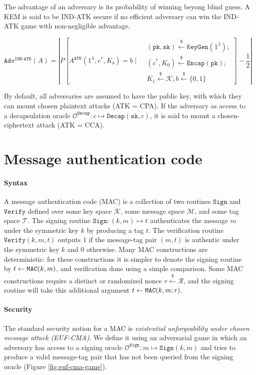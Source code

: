 \documentclass[letterpaper,12pt,titlepage,oneside,final]{book}
\newcommand{\keygen}{\texttt{KeyGen}}
\newcommand{\encap}{\texttt{Encap}}
\newcommand{\decap}{\texttt{Decap}}
\newcommand{\mac}{\texttt{\texttt{MAC}}}
\newcommand{\sign}{\texttt{Sign}}
\newcommand{\verify}{\texttt{Verify}}
\newcommand{\pk}{\texttt{pk}}
\newcommand{\sk}{\texttt{sk}}
\newcommand{\leftsample}{\stackrel{\$}{\leftarrow}}
\begin{document}
The advantage of an adversary is its probability of winning beyong blind guess. A KEM is said to be IND-ATK secure if no efficient adversary can win the IND-ATK game with non-negligible advantage.

$$
\texttt{Adv}^\texttt{IND-ATK}(A) = \left\vert P\left[
    A^\texttt{ATK}(1^\lambda, c^\ast, K_b) = b
    \mid \begin{aligned}
    &(\pk, \sk) \leftsample \keygen(1^\lambda); \\
    &(c^\ast, K_0) \leftsample \encap(\pk); \\
    &K_1 \leftsample \mathcal{K}; b \leftsample \{0,1\}
    \end{aligned}
\right] - \frac{1}{2}
\right\vert
$$

By default, all adversaries are assumed to have the public key, with which they can mount chosen plaintext attacks (ATK = CPA). If the adversary as access to a decapsulation oracle $\mathcal{O}^\decap: c \mapsto \decap(\sk, c)$, it is said to mount a chosen-ciphertext attack (ATK = CCA).

\section{Message authentication code}\label{sec:message-authentication-code}
\paragraph{Syntax} A message authentication code (MAC) is a collection of two routines $\sign$ and $\verify$ defined over some key space $\mathcal{K}$, some message space $\mathcal{M}$, and some tag space $\mathcal{T}$. The signing routine $\sign: (k, m) \mapsto t$ authenticates the message $m$ under the symmetric key $k$ by producing a tag $t$. The verification routine $\verify(k,m,t)$ outputs $1$ if the message-tag pair $(m, t)$ is authentic under the symmetric key $k$ and $0$ otherwise. Many MAC constructions are deterministic: for these constructions it is simpler to denote the signing routine by $t \leftarrow \mac(k, m)$, and verification done using a simple comparison. Some MAC constructions require a distinct or randomized nonce $r \leftsample \mathcal{R}$, and the signing routine will take this additional argument $t \leftarrow \mac(k, m; r)$.

\paragraph{Security} The standard security notion for a MAC is \textit{existential unforgeability under chosen message attack (EUF-CMA)}. We define it using an adversarial game in which an adversary has access to a signing oracle $\mathcal{O}^\sign: m \mapsto \sign(k, m)$ and tries to produce a valid message-tag pair that has not been queried from the signing oracle (Figure \ref{fig:euf-cma-game}).
\end{document}
